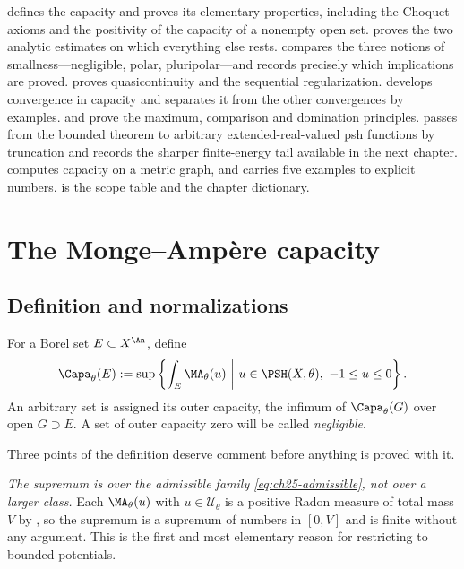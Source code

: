  defines the capacity and proves its elementary
properties, including the Choquet axioms and the positivity of the capacity
of a nonempty open set.   proves the two analytic
estimates on which everything else rests.  
compares the three notions of smallness---negligible, polar, pluripolar---and
records precisely which implications are proved.
 proves quasicontinuity and the sequential
regularization.   develops convergence in capacity
and separates it from the other convergences by examples.
 and  prove the maximum,
comparison and domination principles.   passes from the
bounded theorem to arbitrary extended-real-valued psh functions by
truncation and records the sharper finite-energy tail available in the next
chapter.   computes capacity on
a metric graph, and  carries five examples to explicit
numbers.   is the scope table and
 the chapter dictionary.

\section{The Monge--Amp\`ere capacity}
\label{sec:ch25-capacity}

\subsection{Definition and normalizations}
\label{sec:ch25-definition}

\begin{definition}[Capacity]
\label{def:bfj-capacity}
For a Borel set $E\subset X^{\An}$, define
\begin{equation}
\label{eq:capacity-definition}
 \Capa_\theta(E)
 :=\sup\left\{\int_E\MA_\theta(u)\ \middle|\
       u\in\PSH(X,\theta),\ -1\leq u\leq0\right\}.
\end{equation}
An arbitrary set is assigned its outer capacity, the infimum of
$\Capa_\theta(G)$ over open $G\supset E$. A set of outer capacity zero
will be called \emph{negligible}.
\end{definition}

Three points of the definition deserve comment before anything is proved
with it.

\emph{The supremum is over the admissible family
\eqref{eq:ch25-admissible}, not over a larger class.}  Each
$\MA_\theta(u)$ with $u\in\mathcal U_\theta$ is a positive Radon measure
of total mass $V$ by \Cref{thm:bounded-ma-extension}, so the supremum is a
supremum of numbers in $[0,V]$ and is finite without any argument.  This is
the first and most elementary reason for restricting to bounded potentials.


